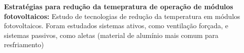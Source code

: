 \textbf{Estratégias para redução da temepratura de operação de módulos
fotovoltaicos:}
Estudo de tecnologias de redução da temperatura em módulos fotovoltaicos. Foram
estudados sistemas ativos, como ventilação forçada, e sistemas passivos,  como
aletas (material de alumínio mais comum para resfriamento)
